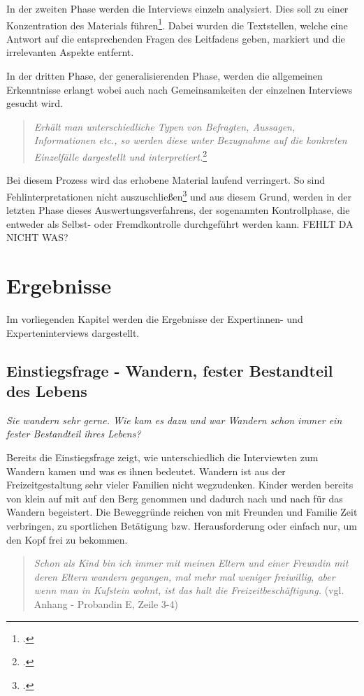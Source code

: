 In der zweiten Phase werden die Interviews einzeln analysiert. Dies soll zu einer Konzentration des Materials führen\footcite[S.368]{lamnek}. Dabei wurden die Textstellen, welche eine Antwort auf die entsprechenden Fragen des Leitfadens geben, markiert und die irrelevanten Aspekte entfernt.

In der dritten Phase, der generalisierenden Phase, werden die allgemeinen Erkenntnisse erlangt wobei auch nach Gemeinsamkeiten der einzelnen Interviews gesucht wird. 

\begin{quote}
	\textit{\glqq Erhält man unterschiedliche Typen von Befragten, Aussagen, Informationen etc., so werden diese unter Bezugnahme auf die konkreten Einzelfälle dargestellt und interpretiert.\grqq}\footcite[S. 369]{lamnek}
\end{quote}

Bei diesem Prozess wird das erhobene Material laufend verringert. So sind Fehlinterpretationen nicht auszuschließen\footcite[S. 369]{lamnek} und aus diesem Grund, werden in der letzten Phase dieses Auswertungsverfahrens, der sogenannten Kontrollphase, die entweder als Selbst- oder Fremdkontrolle durchgeführt werden kann. FEHLT DA NICHT WAS?


\section{Ergebnisse}

Im vorliegenden Kapitel werden die Ergebnisse der Expertinnen- und Experteninterviews dargestellt. 

\subsection{Einstiegsfrage - Wandern, fester Bestandteil des Lebens}

\textit{Sie wandern sehr gerne. Wie kam es dazu und war Wandern schon immer ein fester Bestandteil ihres Lebens?}

Bereits die Einstiegsfrage zeigt, wie unterschiedlich die Interviewten zum Wandern kamen und was es ihnen bedeutet.
Wandern ist aus der Freizeitgestaltung sehr vieler Familien nicht wegzudenken. Kinder werden bereits von klein auf mit auf den Berg genommen und dadurch nach und nach für das Wandern begeistert. Die Beweggründe reichen von mit Freunden und Familie Zeit verbringen, zu sportlichen Betätigung bzw. Herausforderung oder einfach nur, um den Kopf frei zu bekommen. 
\begin{quote}
	\textit{\glqq Schon als Kind bin ich immer mit meinen Eltern und einer Freundin mit deren Eltern wandern gegangen, mal mehr mal weniger freiwillig, aber wenn man in Kufstein wohnt, ist das halt die Freizeitbeschäftigung.\grqq} (vgl. Anhang - Probandin E, Zeile 3-4)
\end{quote}

